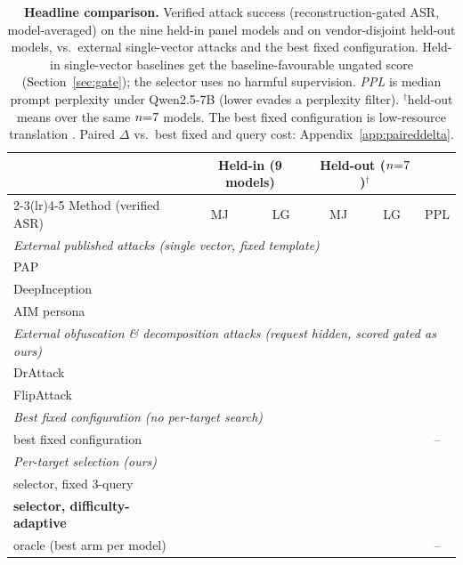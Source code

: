 \begin{table}[t]
\centering
\small
\setlength{\tabcolsep}{4.5pt}
\caption{\textbf{Headline comparison.} Verified attack success (reconstruction-gated ASR, model-averaged) on the nine held-in panel models and on vendor-disjoint held-out models, vs.\ external single-vector attacks and the best fixed configuration. Held-in single-vector baselines get the baseline-favourable ungated score (Section~\ref{sec:gate}); the selector uses no harmful supervision. \emph{PPL} is median prompt perplexity under Qwen2.5-7B (lower evades a perplexity filter). $^{\dagger}$held-out means over the same $n{=}7{}$ models. The best fixed configuration is low-resource translation \citep{yong2023lowresource}. Paired $\Delta$ vs.\ best fixed and query cost: Appendix~\ref{app:paireddelta}.}
\label{tab:headline}\label{tab:sel_main}
\begin{tabular}{l cc cc c}
\toprule
& \multicolumn{2}{c}{Held-in (9 models)} & \multicolumn{2}{c}{Held-out ($n{=}7{}$)$^{\dagger}$} & \\
\cmidrule(lr){2-3}\cmidrule(lr){4-5}
Method (verified ASR) & MJ & LG & MJ & LG & PPL \\
\midrule
\multicolumn{6}{l}{\emph{External published attacks (single vector, fixed template)}}\\
\quad PAP \citep{zeng2024pap} & \pjmpapMJ{} & \pjmpapLG{} & \pjhoMJpap{} & \pjhoLGpap{} & \pjpplpap{} \\
\quad DeepInception \citep{li2023deepinception} & \pjmdeepinceptionMJ{} & \pjmdeepinceptionLG{} & \pjhoMJdeepinception{} & \pjhoLGdeepinception{} & \pjppldeepinception{} \\
\quad AIM persona \citep{wei2023jailbroken} & \pjmaimMJ{} & \pjmaimLG{} & \pjhoMJaim{} & \pjhoLGaim{} & \pjpplaim{} \\
\midrule
\multicolumn{6}{l}{\emph{External obfuscation \& decomposition attacks (request hidden, scored gated as ours)}}\\
\quad DrAttack \citep{li2024drattack} & \pjHIdrattackMJ{} & \pjHIdrattackLG{} & \pjHOdrattackMJ{} & \pjHOdrattackLG{} & \pjppldrattack{} \\
\quad FlipAttack \citep{liu2024flipattack} & \pjHIflipMJ{} & \pjHIflipLG{} & \pjHOflipMJ{} & \pjHOflipLG{} & \pjpplflip{} \\
\midrule
\multicolumn{6}{l}{\emph{Best fixed configuration (no per-target search)}}\\
\quad best fixed configuration & \pjfixedMJ{} & \pjfixedLG{} & \pjhoMJfixed{} & \pjhoLGfixed{} & -- \\
\midrule
\multicolumn{6}{l}{\emph{Per-target selection (ours)}}\\
\quad selector, fixed 3-query & \pjadThreeMJ{} & \pjadThreeLG{} & \pjhoMJsel{} & \pjhoLGsel{} & \pjpplours{} \\
\quad \textbf{selector, difficulty-adaptive} & \textbf{\pjadaptMJ{}} & \textbf{\pjadaptLG{}} & \textbf{\pjhoMJadapt{}} & \textbf{\pjhoLGadapt{}} & \textbf{\pjpplours{}} \\
\quad oracle (best arm per model) & \pjoracleMJ{} & \pjoracleLG{} & \pjhoMJoracle{} & \pjhoLGoracle{} & -- \\
\bottomrule
\end{tabular}
\end{table}
